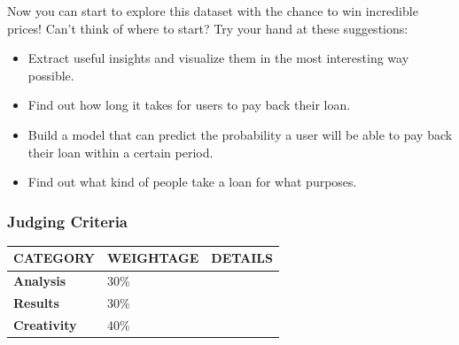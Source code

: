 \documentclass[
]{article}
\providecommand{\tightlist}{%
  \setlength{\itemsep}{0pt}\setlength{\parskip}{0pt}}
\begin{document}
Now you can start to explore this dataset with the chance to win
incredible prices! Can't think of where to start? Try your hand at these
suggestions:

\begin{itemize}
\tightlist
\item
  Extract useful insights and visualize them in the most interesting way
  possible.
\item
  Find out how long it takes for users to pay back their loan.
\item
  Build a model that can predict the probability a user will be able to
  pay back their loan within a certain period.
\item
  Find out what kind of people take a loan for what purposes.
\end{itemize}

\hypertarget{judging-criteria}{%
\subsubsection{Judging Criteria}\label{judging-criteria}}

\begin{longtable}[]{@{}lll@{}}
\toprule
CATEGORY & WEIGHTAGE & DETAILS \\
\midrule
\endhead
\textbf{Analysis} & 30\% & \\
\textbf{Results} & 30\% & \\
\textbf{Creativity} & 40\% & \\
\bottomrule
\end{longtable}
\end{document}
